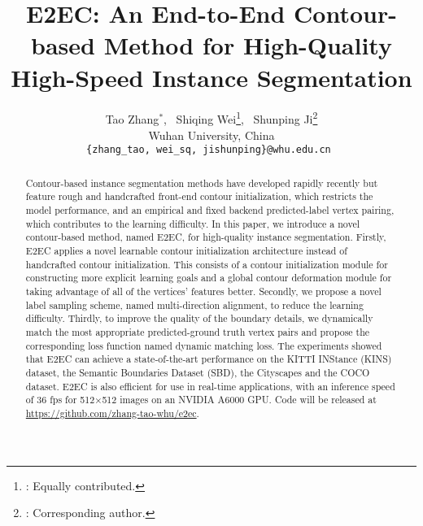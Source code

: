 \documentclass[10pt,twocolumn,letterpaper]{article}
\begin{document}
\title{E2EC: An End-to-End Contour-based Method for High-Quality High-Speed Instance Segmentation}

\author{
{
Tao Zhang$^{*}$, ~Shiqing Wei\thanks{ : Equally contributed.}, ~Shunping Ji\thanks{ : Corresponding author.}}\\
{
Wuhan University, China}\\
\small \tt \{zhang\_tao,  wei\_sq, jishunping\}@whu.edu.cn 
}
\maketitle

\begin{abstract}
Contour-based instance segmentation methods have developed rapidly recently but feature rough and handcrafted front-end contour initialization, which restricts the model performance, and an empirical and fixed backend predicted-label vertex pairing, which contributes to the learning difficulty. In this paper, we introduce a novel contour-based method, named E2EC, for high-quality instance segmentation. Firstly, E2EC applies a novel learnable contour initialization architecture instead of handcrafted contour initialization. This consists of a contour initialization module for constructing more explicit learning goals and a global contour deformation module for taking advantage of all of the vertices' features better. Secondly, we propose a novel label sampling scheme, named multi-direction alignment, to reduce the learning difficulty. Thirdly, to improve the quality of the boundary details, we dynamically match the most appropriate predicted-ground truth vertex pairs and propose the corresponding loss function named dynamic matching loss. The experiments showed that E2EC can achieve a state-of-the-art performance on the KITTI INStance (KINS) dataset, the Semantic Boundaries Dataset (SBD), the Cityscapes and the COCO dataset. E2EC is also efficient for use in real-time applications, with an inference speed of 36 fps for 512×512 images on an NVIDIA A6000 GPU. Code will be released at \href{https://github.com/zhang-tao-whu/e2ec}{https://github.com/zhang-tao-whu/e2ec}.
\end{abstract}\vspace{-5mm}
\end{document}
